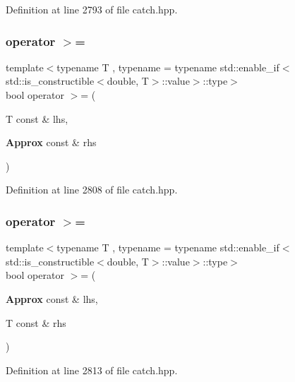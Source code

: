 Definition at line 2793 of file catch.\+hpp.

\mbox{\label{class_catch_1_1_detail_1_1_approx_ae68a144dad95cfe31786d2df0b25bb02}} 
\subsubsection{operator $>$=\hspace{0.1cm}{\footnotesize\ttfamily [1/2]}}
{\footnotesize\ttfamily template$<$typename T , typename  = typename std\+::enable\+\_\+if$<$std\+::is\+\_\+constructible$<$double, T$>$\+::value$>$\+::type$>$ \\
bool operator $>$= (\begin{DoxyParamCaption}\item[{T const \&}]{lhs,  }\item[{\textbf{ Approx} const \&}]{rhs }\end{DoxyParamCaption})\hspace{0.3cm}{\ttfamily [friend]}}



Definition at line 2808 of file catch.\+hpp.

\mbox{\label{class_catch_1_1_detail_1_1_approx_aef8dca60ba535199c0703e1e3a25562b}} 
\subsubsection{operator $>$=\hspace{0.1cm}{\footnotesize\ttfamily [2/2]}}
{\footnotesize\ttfamily template$<$typename T , typename  = typename std\+::enable\+\_\+if$<$std\+::is\+\_\+constructible$<$double, T$>$\+::value$>$\+::type$>$ \\
bool operator $>$= (\begin{DoxyParamCaption}\item[{\textbf{ Approx} const \&}]{lhs,  }\item[{T const \&}]{rhs }\end{DoxyParamCaption})\hspace{0.3cm}{\ttfamily [friend]}}



Definition at line 2813 of file catch.\+hpp.


